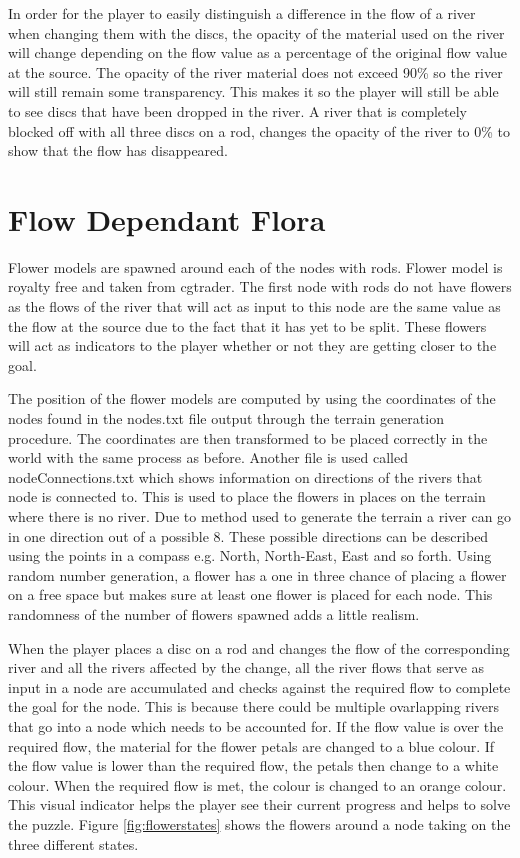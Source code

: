 \newline
\par
In order for the player to easily distinguish a difference in the flow of a river when changing them with the discs, the opacity of the material used on the river will change depending on the flow value as a percentage of the original flow value at the source. The opacity of the river material does not exceed 90\% so the river will still remain some transparency. This makes it so the player will still be able to see discs that have been dropped in the river. A river that is completely blocked off with all three discs on a rod, changes the opacity of the river to 0\% to show that the flow has disappeared.

\section{Flow Dependant Flora}
Flower models are spawned around each of the nodes with rods. Flower model is royalty free and taken from cgtrader\cite{flowermodel}. The first node with rods do not have flowers as the flows of the river that will act as input to this node are the same value as the flow at the source due to the fact that it has yet to be split. These flowers will act as indicators to the player whether or not they are getting closer to the goal.
\newline
\par
The position of the flower models are computed by using the coordinates of the nodes found in the nodes.txt file output through the terrain generation procedure. The coordinates are then transformed to be placed correctly in the world with the same process as before. Another file is used called nodeConnections.txt which shows information on directions of the rivers that node is connected to. This is used to place the flowers in places on the terrain where there is no river. Due to method used to generate the terrain a river can go in one direction out of a possible 8. These possible directions can be described using the points in a compass e.g. North, North-East, East and so forth. Using random number generation, a flower has a one in three chance of placing a flower on a free space but makes sure at least one flower is placed for each node. This randomness of the number of flowers spawned adds a little realism.
\newline
\par
When the player places a disc on a rod and changes the flow of the corresponding river and all the rivers affected by the change, all the river flows that serve as input in a node are accumulated and checks against the required flow to complete the goal for the node. This is because there could be multiple ovarlapping rivers that go into a node which needs to be accounted for. If the flow value is over the required flow, the material for the flower petals are changed to a blue colour. If the flow value is lower than the required flow, the petals then change to a white colour. When the required flow is met, the colour is changed to an orange colour. This visual indicator helps the player see their current progress and helps to solve the puzzle. Figure \ref{fig:flowerstates} shows the flowers around a node taking on the three different states.

